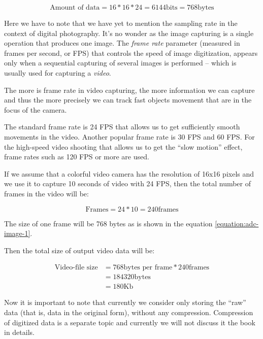 \documentclass[../sparc.tex]{subfiles}
\begin{document}
\begin{equation}
  \mbox{Amount of data} = 16 * 16 * 24 = 6144 \mbox{bits} = 768 \mbox{bytes}
  \label{equation:adc-image-1}
\end{equation}

Here we have to note that we have yet to mention the sampling rate in the
context of digital photography.  It's no wonder as the image capturing is a
single operation that produces one image.  The \emph{frame rate} parameter
(measured in frames per second, or \gls{FPS}) that controls the speed of image
digitization, appears only when a sequential capturing of several images is
performed -- which is usually used for capturing a \emph{video}.

The more is frame rate in video capturing, the more information we can capture
and thus the more precisely we can track fast objects movement that are in the
focus of the camera.

The standard frame rate is 24 \gls{FPS} that allows us to get sufficiently
smooth movements in the video.  Another popular frame rate is 30 FPS and 60 FPS.
For the high-speed video shooting that allows us to get the ``slow motion''
effect, frame rates such as 120 FPS or more are used.

If we assume that a colorful video camera has the resolution of 16x16 pixels and
we use it to capture 10 seconds of video with 24 FPS, then the total number of
frames in the video will be:

\begin{equation}
  \mbox{Frames} = 24 * 10 = 240 \mbox{frames}
\end{equation}

The size of one frame will be 768 bytes as is shown in the equation
\ref{equation:adc-image-1}.

Then the total size of output video data will be:

\begin{align}
  \mbox{Video-file size} & = 768 \mbox{bytes per frame} * 240 \mbox{frames} \\
  & = 184320 \mbox{bytes} \\
  & = 180 \mbox{Kb}
  \label{equation:adc-image-2}
\end{align}

Now it is important to note that currently we consider only storing the ``raw''
data (that is, data in the original form), without any compression.  Compression
of digitized data is a separate topic and currently we will not discuss it the
book in details.
\end{document}
